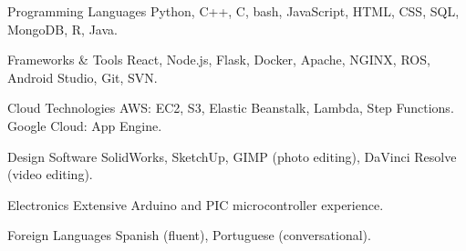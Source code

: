 
\begin{cvskills}
  \cvskill
    {Programming Languages} %
    {Python, C++, C, bash, JavaScript, HTML, CSS, SQL, MongoDB, R, Java.} %

  \cvskill
    {Frameworks \& Tools} %
    {React, Node.js, Flask, Docker, Apache, NGINX, ROS, Android Studio, Git, SVN.} %

  \cvskill
    {Cloud Technologies} %
    {AWS: EC2, S3, Elastic Beanstalk, Lambda, Step Functions. Google Cloud: App Engine.} %

  \cvskill
    {Design Software}
    {SolidWorks, SketchUp, GIMP (photo editing), DaVinci Resolve (video editing).}

  \cvskill
    {Electronics}
    {Extensive Arduino and PIC microcontroller experience.}

  \cvskill
    {Foreign Languages}
    {Spanish (fluent), Portuguese (conversational).}

\end{cvskills}
